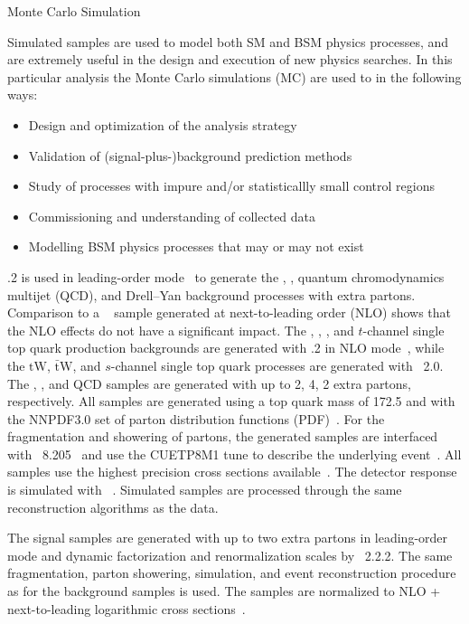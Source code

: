 \begin{section}{Monte Carlo Simulation}

Simulated samples are used to model both SM and BSM physics processes, and are extremely useful in the design and execution of new physics searches.
In this particular analysis the Monte Carlo simulations (MC) are used to in the following ways:
\begin{itemize}
\item Design and optimization of the analysis strategy
\item Validation of (signal-plus-)background prediction methods
\item Study of processes with impure and/or statisticallly small control regions
\item Commissioning and understanding of collected data
\item Modelling BSM physics processes that may or may not exist
\end{itemize}

.2 is used in leading-order mode~\cite{Alwall:2014hca,Alwall:2007fs} to generate the
\ttbar, \Wjets, quantum chromodynamics multijet (QCD), and Drell--Yan background processes with extra partons.
Comparison to a ~\cite{Nason:2004rx,Frixione:2007vw,Alioli:2010xd} sample generated at next-to-leading order (NLO) shows
that the NLO effects do not have a significant impact.
The \ttW, \ttZ, \tttt, and $t$-channel single top quark production backgrounds
are generated with .2 in NLO mode~\cite{Frederix:2012ps}, while
the $\mathrm{tW}$, $\mathrm{\bar{t}W}$, and $s$-channel single top quark processes are generated with \POWHEG~2.0.
The \ttbar, \Wjets, and QCD samples are generated with up to 2, 4, 2 extra partons, respectively.
All samples are generated using a top quark mass of 172.5 \GeV and with the NNPDF3.0 set of parton distribution functions (PDF)~\cite{Ball:2014uwa}.
For the fragmentation and showering of partons, the generated samples are interfaced with \PYTHIA~8.205~\cite{pythia8.2} and use the CUETP8M1 tune to describe the underlying event~\cite{Skands2014}.
All samples use the highest precision cross sections available~\cite{PhysRevLett.110.252004,Gavin:2012sy,Alioli:2009je,Re:2010bp,Frixione:2015zaa,Bevilacqua:2012em,Nagy:2001fj}.
The detector response is simulated with \GEANTfour~\cite{Agostinelli:2002hh}.
Simulated samples are processed through the same reconstruction algorithms as the data.

The signal samples are generated with up to two extra partons in leading-order mode and dynamic factorization and renormalization scales by \MGatNLO~2.2.2.
The same fragmentation, parton showering, simulation, and event reconstruction procedure as for the background samples is used.
The samples are normalized to NLO + next-to-leading logarithmic cross sections~\cite{XSecgluinogluino}.

\end{section}

